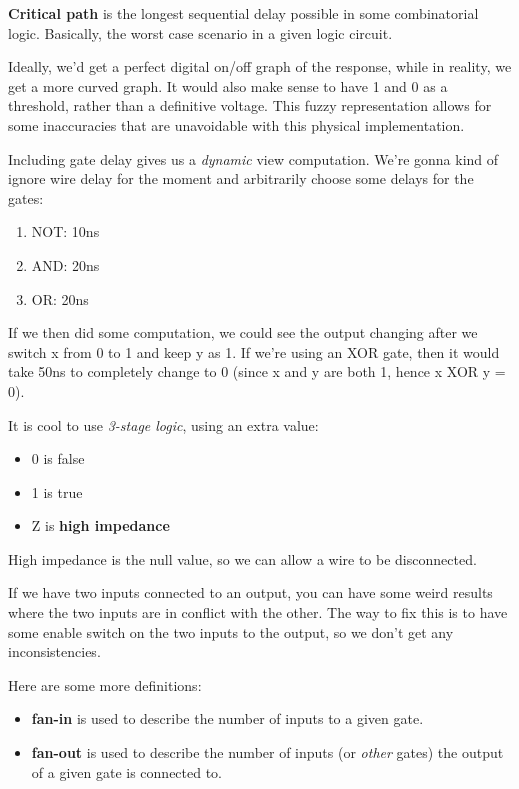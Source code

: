\documentclass[11pt,a4paper,titlepage,dvipsnames,cmyk]{scrartcl}
\begin{document}
\textbf{Critical path} is the longest sequential delay possible in some
combinatorial logic. Basically, the worst case scenario in a given logic
circuit.

Ideally, we'd get a perfect digital on/off graph of the response, while in
reality, we get a more curved graph. It would also make sense to have 1
and 0 as a threshold, rather than a definitive voltage. This fuzzy
representation allows for some inaccuracies that are unavoidable with this
physical implementation.

Including gate delay gives us a \textit{dynamic} view computation. We're
gonna kind of ignore wire delay for the moment and arbitrarily choose some
delays for the gates:
\begin{enumerate}
    \item NOT: 10ns
    \item AND: 20ns
    \item OR: 20ns
\end{enumerate}

If we then did some computation, we could see the output changing after we
switch x from 0 to 1 and keep y as 1. If we're using an XOR gate, then it
would take 50ns to completely change to 0 (since x and y are both 1, hence
x XOR y = 0).

It is cool to use \textit{3-stage logic}, using an extra value:
\begin{itemize}
    \item 0 is false
    \item 1 is true
    \item Z is \textbf{high impedance}
\end{itemize}

High impedance is the null value, so we can allow a wire to be
disconnected.

If we have two inputs connected to an output, you can have some weird
results where the two inputs are in conflict with the other. The way to
fix this is to have some enable switch on the two inputs to the output, so
we don't get any inconsistencies.

Here are some more definitions:
\begin{itemize}
    \item \textbf{fan-in} is used to describe the number of inputs to a
        given gate.
    \item \textbf{fan-out} is used to describe the number of inputs (or
        \textit{other} gates) the output of a given gate is connected to.
\end{itemize}
\end{document}
